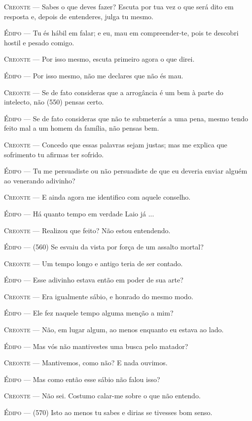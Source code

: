 \textsc{Creonte} --- Sabes o que deves fazer? Escuta por tua vez o que será dito em resposta
e, depois de entenderes, julga tu mesmo.

\textsc{Édipo} --- Tu és hábil em falar; e eu, mau em compreender-te, pois te descobri
hostil e pesado comigo.

\textsc{Creonte} --- Por isso mesmo, escuta primeiro agora o que direi.

\textsc{Édipo} --- Por isso mesmo, não me declares que não és mau.

\textsc{Creonte} --- Se de fato consideras que a arrogância é um bem à parte do intelecto,
não (550) pensas certo.

\textsc{Édipo} --- Se de fato consideras que não te submeterás a uma pena, mesmo tendo
feito mal a um homem da família, não pensas bem.

\textsc{Creonte} --- Concedo que essas palavras sejam justas; mas me explica que sofrimento
tu afirmas ter sofrido.

\textsc{Édipo} --- Tu me persuadiste ou não persuadiste de que eu deveria enviar alguém ao
venerando adivinho?

\textsc{Creonte} --- E ainda agora me identifico com aquele conselho.

\textsc{Édipo} --- Há quanto tempo em verdade Laio já ...

\textsc{Creonte} --- Realizou que feito? Não estou entendendo.

\textsc{Édipo} --- (560) Se esvaiu da vista por força de um assalto mortal?

\textsc{Creonte} --- Um tempo longo e antigo teria de ser contado.

\textsc{Édipo} --- Esse adivinho estava então em poder de sua arte?

\textsc{Creonte} --- Era igualmente sábio, e honrado do mesmo modo.

\textsc{Édipo} --- Ele fez naquele tempo alguma menção a mim?

\textsc{Creonte} --- Não, em lugar algum, ao menos enquanto eu estava ao lado.

\textsc{Édipo} --- Mas vós não mantivestes uma busca pelo matador?

\textsc{Creonte} --- Mantivemos, como não? E nada ouvimos.

\textsc{Édipo} --- Mas como então esse sábio não falou isso?

\textsc{Creonte} --- Não sei. Costumo calar-me sobre o que não entendo.

\textsc{Édipo} --- (570) Isto ao menos tu sabes e dirias se tivesses bom senso.


